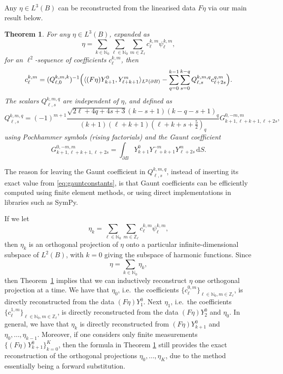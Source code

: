 \documentclass[reqno]{amsart}
\numberwithin{equation}{section}
\numberwithin{figure}{section}
\numberwithin{table}{section}
\theoremstyle{plain}
\newtheorem{theorem}{Theorem}[section]
\theoremstyle{definition}
\theoremstyle{remark}
\newcommand{\inner}[1]{\langle#1\rangle}
\newcommand{\di}{\mathrm{d}}   %
\newcommand{\N}{\mathbb{N}}
\newcommand{\Z}{\mathbb{Z}}
\begin{document}
Any $\eta\in L^3(B)$ can be reconstructed from the linearised data $F\eta$ via our main result below.
%
\begin{theorem} \label{thm:main}
    For any $\eta \in L^3(B)$, expanded as
    \begin{equation*}
		\eta = \sum_{k\in\N_0}\sum_{\ell\in\N_0}\sum_{m\in\Z_\ell} c_\ell^{k,m}\psi_\ell^{k,m},
    \end{equation*}
    for an $\ell^2$-sequence of coefficients $c_{\ell}^{k,m}$, then
    \begin{equation*}
		c_{\ell}^{k,m} = (Q_{\ell,0}^{k,m,k})^{-1}\Bigl( \inner{(F\eta)Y_{k+1}^0,Y_{\ell+k+1}^m}_{L^2(\partial B)} - \sum_{q=0}^{k-1}\sum_{s = 0}^{k-q} Q_{\ell,s}^{k,m,q}c_{\ell+2s}^{q,m}  \Bigr).
    \end{equation*}
    The scalars $Q_{\ell,s}^{k,m,q}$ are independent of $\eta$, and defined as 
    \begin{equation*}
        Q_{\ell,s}^{k,m,q} = (-1)^{m+1}\frac{\sqrt{2\ell+4q+4s+3}(k-s+1)(k-q-s+1)_q}{(k+1)(\ell+k+1)(\ell+k+s+\tfrac{5}{2})_q}G_{k+1,\ell+k+1,\ell+2s}^{0,-m,m},
    \end{equation*}
    using Pochhammer symbols (rising factorials) and the Gaunt coefficient
    \begin{equation*}
		G_{k+1,\ell+k+1,\ell+2s}^{0,-m,m} = \int_{\partial B} Y_{k+1}^0 Y_{\ell+k+1}^{-m}Y_{\ell+2s}^{m}\,\di S.
    \end{equation*}
\end{theorem}

The reason for leaving the Gaunt coefficient in $Q_{\ell,s}^{k,m,q}$, instead of inserting its exact value from \eqref{eq:gauntconstants}, is that Gaunt coefficients can be efficiently computed using finite element methods, or using direct implementations in libraries such as SymPy.

If we let 
%
\begin{equation*}
    \eta_k = \sum_{\ell\in\N_0}\sum_{m\in\Z_\ell} c_\ell^{k,m}\psi_\ell^{k,m},
\end{equation*}
%
then $\eta_k$ is an orthogonal projection of $\eta$ onto a particular infinite-dimensional subspace of $L^2(B)$, with $k=0$ giving the subspace of harmonic functions. Since
%
\begin{equation*}
    \eta = \sum_{k\in\N_0} \eta_k,
\end{equation*}
%
then Theorem~\ref{thm:main} implies that we can inductively reconstruct $\eta$ one orthogonal projection at a time. We have that $\eta_0$, i.e.\ the coefficients $\{c_{\ell}^{0,m}\}_{\ell\in\N_0,m\in\Z_\ell}$, is directly reconstructed from the data $(F\eta)Y_1^0$. Next $\eta_1$, i.e.\ the coefficients $\{c_{\ell}^{1,m}\}_{\ell\in\N_0,m\in\Z_\ell}$, is directly reconstructed from the data $(F\eta)Y_2^0$ and $\eta_0$. In general, we have that $\eta_k$ is directly reconstructed from $(F\eta)Y_{k+1}^0$ and $\eta_0,\dots,\eta_{k-1}$. Moreover, if one considers only finite measurements $\{(F\eta)Y_{k+1}^0\}_{k=0}^K$, then the formula in Theorem \ref{thm:main} still provides the exact reconstruction of the orthogonal projections $\eta_0,\dots,\eta_K$, due to the method essentially being a forward substitution.
\end{document}
